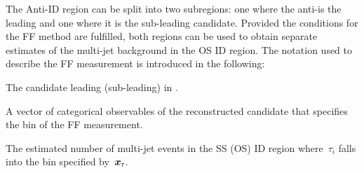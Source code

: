 {%
  \newcommand*{\ffargs}{\ensuremath{( \myvec{x}_{\tau} )}\xspace}

  \newcommand*{\NmjID}[2]{\ensuremath{N_\text{multi-jet}^{\text{#1, loose }\tau_{#2}}}\xspace}
  \newcommand*{\NmjIDIncl}[1]{\ensuremath{N_\text{multi-jet}^{\text{#1, ID}}}\xspace}

  \newcommand*{\NmjAntiIDIncl}[1]{\ensuremath{N_\text{multi-jet}^{\text{#1, Anti-ID}}}\xspace}
  \newcommand*{\NmjAntiID}[2]{\ensuremath{N_\text{multi-jet}^{\text{#1, anti-}\tau_{#2}}}\xspace}

  The Anti-ID region can be split into two subregions: one where the
  anti-\tauhadvis is the leading and one where it is the sub-leading \tauhadvis
  candidate. Provided the conditions for the FF method are fulfilled, both
  regions can be used to obtain separate estimates of the multi-jet background
  in the OS ID region. The notation used to describe the FF measurement is
  introduced in the following:
  \begin{description}[style=standard]
  \item[$\tau_0$ ($\tau_1$)] The \tauhadvis candidate leading (sub-leading) in \pT.

  \item[$\myvec{x}_\tau$] A vector of categorical observables of the
    reconstructed \tauhadvis candidate that specifies the bin of the FF
    measurement.

  \item[$\NmjID{SS(OS)}{i}\ffargs$] The estimated number of multi-jet events in
    the SS (OS) ID region where~$\tau_i$ falls into the bin specified
    by~$\myvec{x}_\tau$.


\end{description}}
